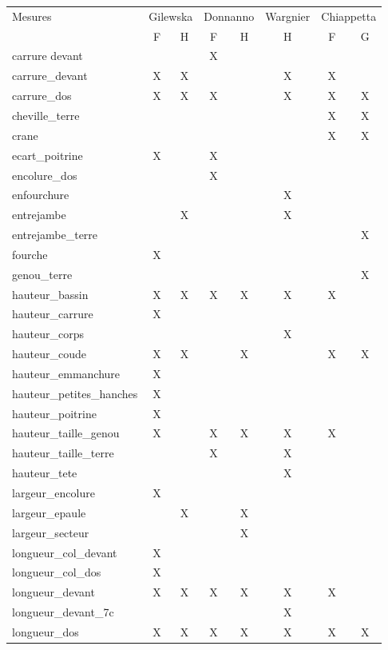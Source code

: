 \documentclass[10pt,a4paper,twoside]{report}
\begin{document}
\begin{table}
\begin{center}
\begin{tabular}{lccccccc} \hline
Mesures & \multicolumn{2}{c}{Gilewska} & \multicolumn{2}{c}{Donnanno} & Wargnier & \multicolumn{2}{c}{Chiappetta}\\
& F & H & F & H & H & F & G\\  \hline
carrure devant&&&X&&&&\\ \hline
carrure\_devant&X&X&&&X&X&\\ \hline
carrure\_dos&X&X&X&&X&X&X\\ \hline
cheville\_terre&&&&&&X&X\\ \hline
crane&&&&&&X&X\\ \hline
ecart\_poitrine&X&&X&&&&\\ \hline
encolure\_dos&&&X&&&&\\ \hline
enfourchure&&&&&X&&\\ \hline
entrejambe&&X&&&X&&\\ \hline
entrejambe\_terre&&&&&&&X\\ \hline
fourche&X&&&&&&\\ \hline
genou\_terre&&&&&&&X\\ \hline
hauteur\_bassin&X&X&X&X&X&X&\\ \hline
hauteur\_carrure&X&&&&&&\\ \hline
hauteur\_corps&&&&&X&&\\ \hline
hauteur\_coude&X&X&&X&&X&X\\ \hline
hauteur\_emmanchure&X&&&&&&\\ \hline
hauteur\_petites\_hanches&X&&&&&&\\ \hline
hauteur\_poitrine&X&&&&&&\\ \hline
hauteur\_taille\_genou&X&&X&X&X&X&\\ \hline
hauteur\_taille\_terre&&&X&&X&&\\ \hline
hauteur\_tete&&&&&X&&\\ \hline
largeur\_encolure&X&&&&&&\\ \hline
largeur\_epaule&&X&&X&&&\\ \hline
largeur\_secteur&&&&X&&&\\ \hline
longueur\_col\_devant&X&&&&&&\\ \hline
longueur\_col\_dos&X&&&&&&\\ \hline
longueur\_devant&X&X&X&X&X&X&\\ \hline
longueur\_devant\_7c&&&&&X&&\\ \hline
longueur\_dos&X&X&X&X&X&X&X\\ \hline

\end{tabular}
\end{center}
\end{table}
\end{document}
